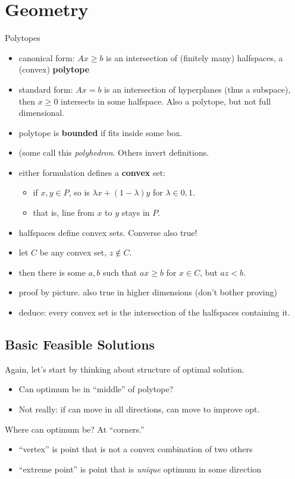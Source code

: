 \documentclass{article}
\begin{document}
\section{Geometry}

Polytopes
\begin{itemize}
\item canonical form: $Ax \ge b$ is an intersection of (finitely many)
  halfspaces, a (convex) {\bf polytope}
\item standard form: $Ax=b$ is an intersection of hyperplanes (thus a
  subspace), then $x \ge 0$ intersects in some halfspace.  Also a
  polytope, but not full dimensional.
\item polytope is {\bf bounded} if fits inside some box.
\item (some call this \emph{polyhedron}.  Others invert definitions.
\item either formulation defines a {\bf convex} set:
  \begin{itemize}
  \item if $x, y \in P$, so is $\lambda x+(1-\lambda)y$ for $\lambda \in
    0,1$.
  \item that is, line from $x$ to $y$ stays in $P$.
  \end{itemize}
\item halfspaces define convex sets.  Converse also true!
  \item let $C$ be any convex set, $z \notin C$.  
  \item then there is some $a,b$ such that $ax \ge b$ for $x \in C$, but
    $az < b$.
\item proof by picture.  also true in higher dimensions (don't bother proving)
\item deduce: every convex set is the intersection of the halfspaces
  containing it.
\end{itemize}

\subsection{Basic Feasible Solutions}

Again, let's start by thinking about structure of optimal solution.
\begin{itemize}
\item Can optimum be in ``middle'' of polytope?
\item Not really: if can move in all directions, can move to improve
  opt.
\end{itemize}

Where can optimum be? At ``corners.''
\begin{itemize}
\item ``vertex'' is point that is not a convex combination of two
others
\item ``extreme point'' is point that is \emph{unique} optimum in some
direction 
\end{itemize}
\end{document}
